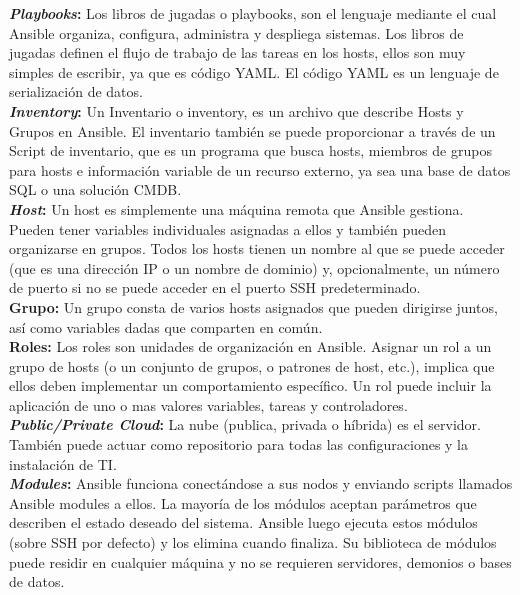 \textbf{\textit{Playbooks}:} Los libros de jugadas o playbooks, son el lenguaje mediante el cual Ansible organiza, configura, administra y despliega sistemas. Los libros de jugadas definen el flujo de trabajo de las tareas en los hosts, ellos son muy simples de escribir, ya que es código YAML. El código YAML es un lenguaje de serialización de datos.\\

\textbf{\textit{Inventory}:} Un Inventario o inventory, es un archivo que describe Hosts y Grupos en Ansible. El inventario también se puede proporcionar a través de un Script de inventario, que es un programa que busca hosts, miembros de grupos para hosts e información variable de un recurso externo, ya sea una base de datos SQL o una solución CMDB.\\

\textbf{\textit{Host}:} Un host es simplemente una máquina remota que Ansible gestiona. Pueden tener variables individuales asignadas a ellos y también pueden organizarse en grupos. Todos los hosts tienen un nombre al que se puede acceder (que es una dirección IP o un nombre de dominio) y, opcionalmente, un número de puerto si no se puede acceder en el puerto SSH predeterminado.\\

\textbf{Grupo:} Un grupo consta de varios hosts asignados que pueden dirigirse juntos, así como variables dadas que comparten en común.\\

\textbf{Roles:} Los roles son unidades de organización en Ansible. Asignar un rol a un grupo de hosts (o un conjunto de grupos, o patrones de host, etc.), implica que ellos deben implementar un comportamiento específico. Un rol puede incluir la aplicación de uno o mas valores variables, tareas y controladores.\\

\textbf{\textit{Public/Private Cloud}:} La nube (publica, privada o híbrida) es el servidor. También puede actuar como repositorio para todas las configuraciones y la instalación de TI.\\

\textbf{\textit{Modules}:} Ansible funciona conectándose a sus nodos y enviando scripts llamados Ansible modules a ellos. La mayoría de los módulos aceptan parámetros que describen el estado deseado del sistema. Ansible luego ejecuta estos módulos (sobre SSH por defecto) y los elimina cuando finaliza. Su biblioteca de módulos puede residir en cualquier máquina y no se requieren servidores, demonios o bases de datos.\\


